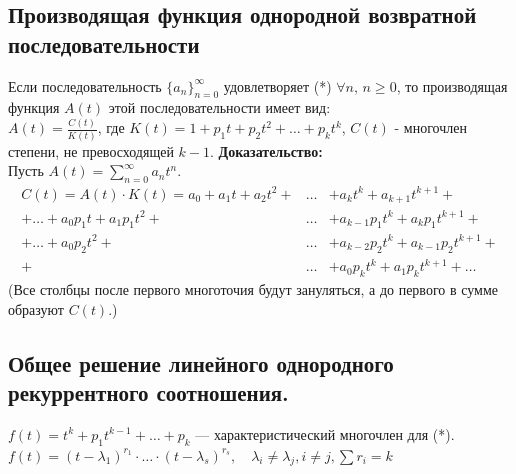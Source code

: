 \documentclass[12pt]{article}
\begin{document}
\subsection{Производящая функция однородной возвратной последовательности}
	Если последовательность $\{ a_n \}_{n=0}^\infty$ удовлетворяет (*) $\forall n, \, n\ge 0$, то производящая функция $A(t)$ этой последовательности имеет вид:\\
	$ \displaystyle A(t) = \frac{C(t)}{K(t)}$, где $ K(t) = 1 + p_1 t + p_2 t^2 +  \ldots + p_k t^k$, $C(t)$ - многочлен степени, не превосходящей $k-1$.
	\textbf{Доказательство:}\\
			Пусть $ \displaystyle A(t) = \sum_{n=0}^\infty a_n t^n$.\\
		\begin{eqnarray*}
			C(t) = A(t)\cdot K(t) = a_0 + a_1t + a_2t^2 +  &\ldots&  + a_kt^k + a_{k+1}t^{k+1} + \\
			+ \ldots  + a_0 p_1t + a_1 p_1 t^2 + &\ldots&  + a_{k-1}p_1 t^k + a_kp_1t^{k+1} + \\
			+ \ldots  + a_0p_2t^2 +  &\ldots&  + a_{k-2}p_2t^k + a_{k-1}p_2t^{k+1} + \\
			+ &\ldots&  + a_0 p_k t^k + a_1 p_k t^{k+1} +  \ldots
		\end{eqnarray*}
		(Все столбцы после первого многоточия будут зануляться, а до первого в сумме образуют $C(t)$.)\\
	\qedsymbol

\subsection{Общее решение линейного однородного рекуррентного соотношения.}
	$ f(t) = t^k + p_1 t^{k-1} +  \ldots  + p_k$ — характеристический многочлен для (*).\\
	$ f(t) = (t-\lambda_1)^{r_1} \cdot  \ldots  \cdot ( t-\lambda_s)^{r_s}, \quad \lambda_i \ne \lambda_j,i\ne j, \sum r_i = k$\\
\end{document}
